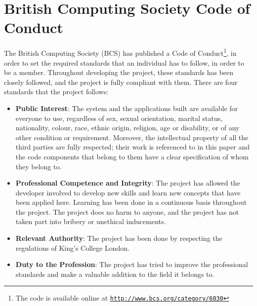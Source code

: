 \section{British Computing Society Code of Conduct}
The British Computing Society (BCS) has published a Code of Conduct\footnote{The code is available online at \texttt{\url{http://www.bcs.org/category/6030}}}, in order to set the required standards that an individual has to follow, in order to be a member. Throughout developing the project, these standards has been closely followed, and the project is fully compliant with them. There are four standards that the project follows:
\begin{itemize}
    \item \textbf{Public Interest}: The system and the applications built are available for everyone to use, regardless of sex, sexual orientation, marital status, nationality, colour, race, ethnic origin, religion, age or disability, or of any other condition or requirement. Moreover, the intellectual property of all the third parties are fully respected; their work is referenced to in this paper and the code components that belong to them have a clear specification of whom they belong to.
    \item \textbf{Professional Competence and Integrity}: The project has allowed the developer involved to develop new skills and learn new concepts that have been applied here. Learning has been done in a continuous basis throughout the project. The project does no harm to anyone, and the project has not taken part into bribery or unethical inducements.
    \item \textbf{Relevant Authority}: The project has been done by respecting the regulations of King's College London.
    \item \textbf{Duty to the Profession}: The project has tried to improve the professional standards and make a valuable addition to the field it belongs to.
\end{itemize}

